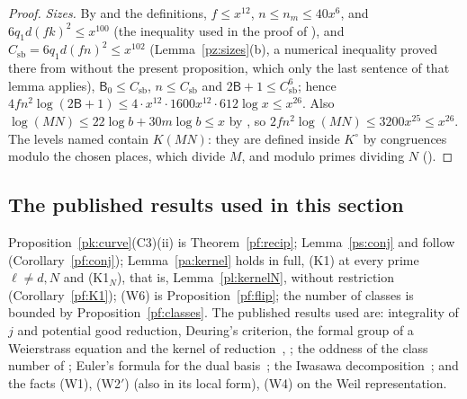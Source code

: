 \documentclass[10pt]{amsart}
\theoremstyle{definition}
\theoremstyle{remark}
\providecommand{\auAz}{\mathcal A_0}
\providecommand{\auNm}{\operatorname{Nm}}
\providecommand{\auO}{\mathcal O}
\providecommand{\auP}{\mathcal P}
\providecommand{\auPa}{\Phi_a}
\providecommand{\auPl}{\Phi}
\providecommand{\auS}{\mathcal S}
\providecommand{\auSram}{\mathcal S^{\mathrm{ram}}}
\providecommand{\auU}{\mathrm U}
\providecommand{\aubar}[1]{\overline{#1}}
\providecommand{\aurd}{\mathrm{rd}_E}
\begin{document}
\begin{proof}
\emph{Sizes.} By {\cite[(38)]{P46}} and the definitions, $f\le x^{12}$, $n\le n_m\le40x^6$, and
$6q_1d(fk)^2\le x^{100}$ (the inequality used in the proof of {\cite[Proposition~14.22]{P46}}), and
$C_{\mathrm{sb}}=6q_1d(fn)^2\le x^{102}$ (Lemma~\ref{pz:sizes}(b), a numerical inequality proved there from {\cite[Lemma~13.4]{P46}} without the present proposition, which only the last sentence of that lemma applies), $\mathsf B_0\le C_{\mathrm{sb}}$, $n\le
C_{\mathrm{sb}}$ and $2\mathsf B+1\le C_{\mathrm{sb}}^6$; hence $4fn^2\log(2\mathsf B+1)\le4\cdot
x^{12}\cdot1600x^{12}\cdot612\log x\le x^{26}$. Also $\log(MN)\le22\log b+30m\log b\le x$ by
{\cite[(36)]{P46}}, so $2fn^2\log(MN)\le3200x^{25}\le x^{26}$. The levels named contain $K(MN)$:
they are defined inside $K^\circ$ by congruences modulo the chosen places, which divide $M$, and
modulo primes dividing $N$ ({\cite[\S14.3]{P46}}).
\end{proof}

\subsection{The published results used in this section}\label{pf:ss-status}
Proposition~\ref{pk:curve}(C3)(ii) is Theorem~\ref{pf:recip}; Lemma~\ref{ps:conj} and
{\cite[Proposition~14.23]{P46}} follow (Corollary~\ref{pf:conj}); Lemma~\ref{pa:kernel} holds in full,
(K1) at every prime $\ell\ne d,N$ and (K1$_N$), that is, Lemma~\ref{pl:kernelN}, without restriction
(Corollary~\ref{pf:K1}); (W6) is Proposition~\ref{pf:flip}; the number of classes is bounded by
Proposition~\ref{pf:classes}. The published results used are: integrality of
$j$ and potential good reduction, Deuring's criterion, the formal group of a Weierstrass equation
and the kernel of reduction~\cite{SilvermanAEC}, \cite[Chapter~13, Theorem~12]{LangEF}; the oddness of the class number of
\cite{CoxPrimes}; Euler's formula for the dual basis~\cite[III, \S6, Lemma~2]{SerreLF}; the Iwasawa
decomposition~\cite[\S3.3.2, p.~51]{TitsCorvallis}; and the facts (W1), (W2$'$) (also in its local form), (W4) on
the Weil representation.




\providecommand{\auO}{\mathcal O}
\providecommand{\auU}{\mathrm U}
\providecommand{\auGL}{\mathrm{GL}}
\providecommand{\auHom}{\operatorname{Hom}}
\providecommand{\auA}{\mathbb A}
\providecommand{\auF}{\mathbb F}
\providecommand{\auPl}{\Phi}
\providecommand{\auPa}{\Phi_a}
\providecommand{\auS}{\mathcal S}
\providecommand{\auSram}{\mathcal S^{\mathrm{ram}}}
\providecommand{\auAz}{\mathcal A_0}
\providecommand{\auG}{\overline G}
\providecommand{\auP}{\mathcal P}
\providecommand{\auNm}{\operatorname{Nm}}
\providecommand{\auAut}{\operatorname{Aut}}
\providecommand{\aubar}[1]{\overline{#1}}
\providecommand{\aueu}{\varepsilon_{\mathrm u}}
\providecommand{\aurd}{\mathrm{rd}_E}
\providecommand{\psM}{\mathsf M}
\providecommand{\psHS}{\mathcal H}
\providecommand{\psrho}{\varrho}
\providecommand{\pzF}{\mathfrak F}
\end{document}
